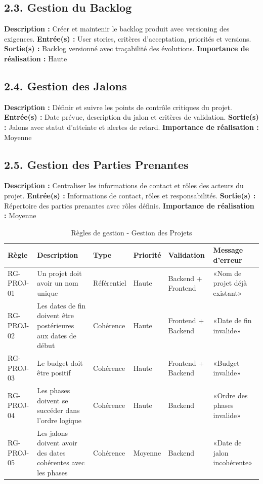 \subsection{2.3. Gestion du Backlog}
\textbf{Description :} Créer et maintenir le backlog produit avec versioning des exigences.
\textbf{Entrée(s) :} User stories, critères d'acceptation, priorités et versions.
\textbf{Sortie(s) :} Backlog versionné avec traçabilité des évolutions.
\textbf{Importance de réalisation :} Haute

\subsection{2.4. Gestion des Jalons}
\textbf{Description :} Définir et suivre les points de contrôle critiques du projet.
\textbf{Entrée(s) :} Date prévue, description du jalon et critères de validation.
\textbf{Sortie(s) :} Jalons avec statut d'atteinte et alertes de retard.
\textbf{Importance de réalisation :} Moyenne

\subsection{2.5. Gestion des Parties Prenantes}
\textbf{Description :} Centraliser les informations de contact et rôles des acteurs du projet.
\textbf{Entrée(s) :} Informations de contact, rôles et responsabilités.
\textbf{Sortie(s) :} Répertoire des parties prenantes avec rôles définis.
\textbf{Importance de réalisation :} Moyenne

\begin{table}[H]
\centering
\footnotesize
\begin{tabular}{|p{1.5cm}|p{3.5cm}|p{1.5cm}|p{1.5cm}|p{2cm}|p{2.5cm}|}
\hline
\textbf{Règle} & \textbf{Description} & \textbf{Type} & \textbf{Priorité} & \textbf{Validation} & \textbf{Message d'erreur} \\
\hline
RG-PROJ-01 & Un projet doit avoir un nom unique & Référentiel & Haute & Backend + Frontend & «Nom de projet déjà existant» \\
\hline
RG-PROJ-02 & Les dates de fin doivent être postérieures aux dates de début & Cohérence & Haute & Frontend + Backend & «Date de fin invalide» \\
\hline
RG-PROJ-03 & Le budget doit être positif & Cohérence & Haute & Frontend + Backend & «Budget invalide» \\
\hline
RG-PROJ-04 & Les phases doivent se succéder dans l'ordre logique & Cohérence & Haute & Backend & «Ordre des phases invalide» \\
\hline
RG-PROJ-05 & Les jalons doivent avoir des dates cohérentes avec les phases & Cohérence & Moyenne & Backend & «Date de jalon incohérente» \\
\hline
\end{tabular}
\caption{Règles de gestion - Gestion des Projets}
\label{tab:rg_projets}
\end{table}


